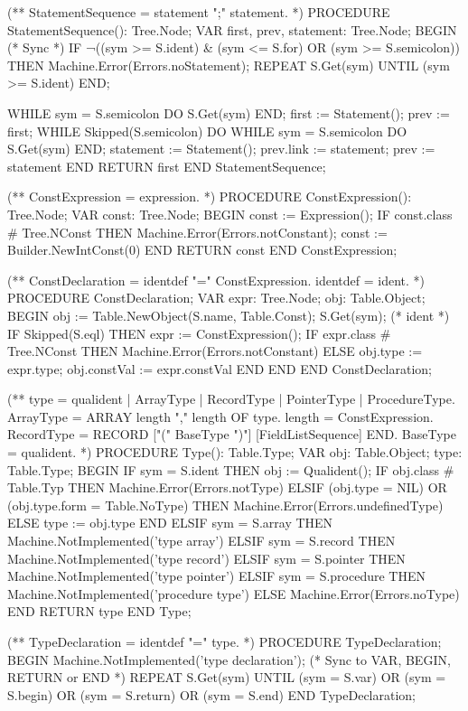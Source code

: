 \documentclass[utf8]{lgu}
\begin{document}
\begin{modula2long}
(** StatementSequence = statement {";" statement}. *)
PROCEDURE StatementSequence(): Tree.Node;
VAR first, prev, statement: Tree.Node;
BEGIN
  (* Sync *)
  IF ¬((sym >= S.ident) & (sym <= S.for) OR (sym >= S.semicolon)) THEN
    Machine.Error(Errors.noStatement);
    REPEAT S.Get(sym) UNTIL (sym >= S.ident)
  END;

  WHILE sym = S.semicolon DO S.Get(sym) END;
  first := Statement();
  prev := first;
  WHILE Skipped(S.semicolon) DO
    WHILE sym = S.semicolon DO S.Get(sym) END;
    statement := Statement();
    prev.link := statement;
    prev := statement
  END
RETURN first END StatementSequence;

(** ConstExpression = expression. *)
PROCEDURE ConstExpression(): Tree.Node;
VAR const: Tree.Node;
BEGIN
  const := Expression();
  IF const.class # Tree.NConst THEN
    Machine.Error(Errors.notConstant);
    const := Builder.NewIntConst(0)
  END
RETURN const END ConstExpression;

(** ConstDeclaration = identdef "=" ConstExpression.
     identdef = ident. *)
PROCEDURE ConstDeclaration;
VAR expr: Tree.Node;
  obj: Table.Object;
BEGIN
  obj := Table.NewObject(S.name, Table.Const);
  S.Get(sym); (* ident *)
  IF Skipped(S.eql) THEN
    expr := ConstExpression();
    IF expr.class # Tree.NConst THEN
      Machine.Error(Errors.notConstant)
    ELSE
      obj.type := expr.type;
      obj.constVal := expr.constVal
    END
  END
END ConstDeclaration;

(** type = qualident | ArrayType | RecordType | PointerType | ProcedureType.
     ArrayType = ARRAY length {"," length} OF type.
     length = ConstExpression.
     RecordType = RECORD ["(" BaseType ")"] [FieldListSequence] END.
     BaseType = qualident. *)
PROCEDURE Type(): Table.Type;
VAR obj: Table.Object;
  type: Table.Type;
BEGIN
  IF sym = S.ident THEN
    obj := Qualident();
    IF obj.class # Table.Typ THEN
      Machine.Error(Errors.notType)
    ELSIF (obj.type = NIL) OR (obj.type.form = Table.NoType) THEN
      Machine.Error(Errors.undefinedType)
    ELSE
      type := obj.type
    END
  ELSIF sym = S.array THEN
    Machine.NotImplemented('type array')
  ELSIF sym = S.record THEN
    Machine.NotImplemented('type record')
  ELSIF sym = S.pointer THEN
    Machine.NotImplemented('type pointer')
  ELSIF sym = S.procedure THEN
    Machine.NotImplemented('procedure type')
  ELSE
    Machine.Error(Errors.noType)
  END
RETURN type END Type;

(** TypeDeclaration = identdef "=" type. *)
PROCEDURE TypeDeclaration;
BEGIN
  Machine.NotImplemented('type declaration');
  (* Sync to VAR, BEGIN, RETURN or END *)
  REPEAT
    S.Get(sym)
  UNTIL (sym = S.var) OR (sym = S.begin) OR (sym = S.return) OR (sym = S.end)
END TypeDeclaration;


\end{modula2long}
\end{document}
